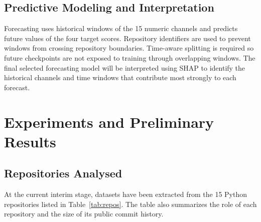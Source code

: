 \documentclass[12pt,a4paper,oneside]{report}
\begin{document}
\section{Predictive Modeling and Interpretation}
Forecasting uses historical windows of the 15 numeric channels and predicts future values of the four target scores. Repository identifiers are used to prevent windows from crossing repository boundaries. Time-aware splitting is required so future checkpoints are not exposed to training through overlapping windows. The final selected forecasting model will be interpreted using SHAP to identify the historical channels and time windows that contribute most strongly to each forecast.

\chapter{Experiments and Preliminary Results}
\label{ch:results}

\section{Repositories Analysed}
At the current interim stage, datasets have been extracted from the 15 Python repositories listed in Table~\ref{tab:repos}. The table also summarizes the role of each repository and the size of its public commit history.
\end{document}
